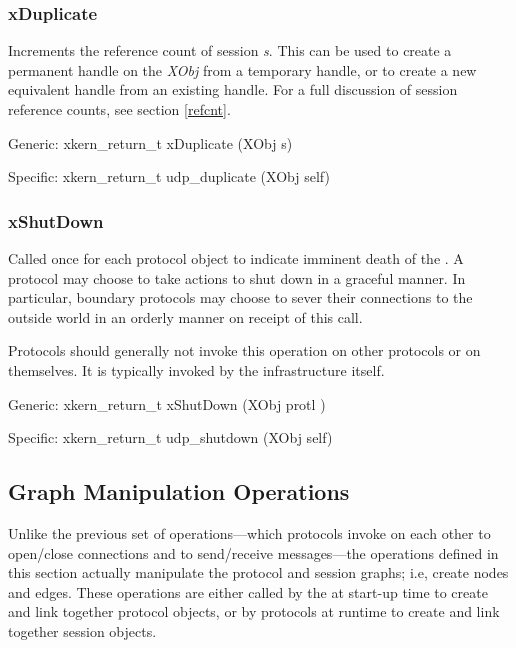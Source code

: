 \subsubsection{xDuplicate}
\label{duplicate}

Increments the reference count of session {\em s}.  This can be used
to create a permanent handle on the {\em XObj} from a temporary handle,
or to create a new equivalent handle from an existing handle. For a
full discussion of session reference counts, see section \ref{refcnt}.
\medskip

{\sanss Generic:} {\sem xkern\_return\_t} {\bold xDuplicate} ({\sem XObj}  {\caps s})
\medskip

{\sanss Specific:} {\sem xkern\_return\_t} {\bold udp\_duplicate} ({\sem XObj}  {\caps self})



\subsubsection{xShutDown}

Called once for each protocol object to indicate imminent death of the
\xk{}.  A protocol may choose to take actions to shut down in a
graceful manner.  In particular, boundary protocols may choose to
sever their connections to the outside world in an orderly manner on
receipt of this call.

Protocols should generally not invoke this operation on other
protocols or on themselves.  It is typically invoked by the \xk{}
infrastructure itself.

\medskip

{\sanss Generic:} {\sem xkern\_return\_t} {\bold xShutDown} 
({\sem XObj} {\caps protl} )
\medskip

{\sanss Specific:} {\sem xkern\_return\_t} {\bold udp\_shutdown} 
({\sem XObj}  {\caps self})



\subsection{Graph Manipulation Operations}
				
Unlike the previous set of operations---which protocols invoke on each
other to open/close connections and to send/receive messages---the
operations defined in this section actually manipulate the protocol
and session graphs; i.e, create nodes and edges. These operations
are either called by the \xk{} at start-up time to create and link
together protocol objects, or by protocols at runtime to create and
link together session objects.


